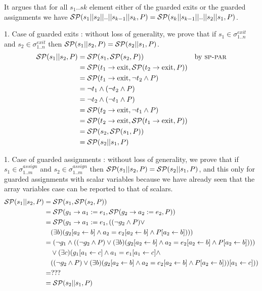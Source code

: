 \documentclass[a4paper,10pt]{article}
\newcommand{\KWexit}{\ensuremath{\mathrm{exit}}}
\newcommand{\vstate}[2]{\ensuremath{\sigma^{\mathit{#1}}_{\mathit{#2}}\xspace}}
\newcommand{\sppar}{\textsc{sp-par}\xspace}
\newenvironment{proof}[1][Proof.]{\begin{trivlist}
\item[\hskip \labelsep {\bfseries #1}]}{\end{trivlist}}
\begin{document}
\begin{proof}
  It argues that for all $s_1 .. sk$ element either of the guarded exits or the guarded assignments
  we have $\mathcal{SP}(s_1||s_2|| .. ||s_{k-1}||s_k,P)=\mathcal{SP}(s_k||s_{k-1}|| .. ||s_2||s_1,P)$. 

1. Case of guarded exits : without loss of generality, 
   we prove that if $s_1 \in \vstate{exit}{1..n}$ and $s_2 \in \vstate{exit}{1..n}$ then  
   $\mathcal{SP}(s_1||s_2,P)=\mathcal{SP}(s_2||s_1,P)$.
  \begin{align*}
    \spost{s_1||s_2}{P}
    &=\spost{s_1}{\spost{s_2}{P}} && \text{by \sppar}\\
    &=\spost{t_1 \rightarrow \KWexit}{\spost{t_2 \rightarrow \KWexit}{P}}\\
    &=\spost{t_1 \rightarrow \KWexit}{\neg t_2 \land P}\\
    &=\neg t_1 \land (\neg t_2 \land P)\\
    &=\neg t_2 \land (\neg t_1 \land P)\\
    &=\spost{t_2 \rightarrow \KWexit}{\neg t_1 \land P}\\
    &=\spost{t_2 \rightarrow \KWexit}{\spost{t_1 \rightarrow \KWexit}{P}}\\
    &=\spost{s_2}{\spost{s_1}{P}}\\
    &=\spost{s_2||s_1}{P}
  \end{align*}

1. Case of guarded assignments : without loss of generality, 
   we prove that if $s_1 \in \vstate{assign}{1..m}$ and $s_2 \in \vstate{assign}{1..m}$ then  
   $\mathcal{SP}(s_1||s_2,P)=\mathcal{SP}(s_2||s_1,P)$, and this only for guarded assignments with 
   scalar variables because we have already seen that the array variables case can be reported 
   to that of scalars.
  \begin{align*}
    \mathcal{SP}(s_1||s_2,P)
    &=\mathcal{SP}(s_1,\mathcal{SP}(s_2,P)) \\
    &=\mathcal{SP}(g_1 \rightarrow a_1 := e_1,\mathcal{SP}(g_2 \rightarrow a_2 := e_2,P)) \\
    &=\mathcal{SP}(g_1 \rightarrow a_1 := e_1,((\neg g_2 \land P) \lor\\
    &\quad (\exists b) (g_2[a_2 \leftarrow b] \land a_2 =e_2[a_2 \leftarrow b] \land P[a_2 \leftarrow b])))\\
    &=( \neg g_1 \land ((\neg g_2 \land P) \lor
    (\exists b) (g_2[a_2 \leftarrow b] \land a_2 =e_2[a_2 \leftarrow b] \land P[a_2 \leftarrow b]))) \\
    &\quad \lor (\exists c)(g_1[a_1 \leftarrow c]\land a_1 =e_1[a_1 \leftarrow c] \land \\
    &\quad ((\neg g_2 \land P) \lor (\exists b) (g_2[a_2 \leftarrow b] \land a_2 =e_2[a_2 \leftarrow b] \land P[a_2 \leftarrow b]))[a_1 \leftarrow c]))\\
    &= ???\\
    &=\mathcal{SP}(s_2||s_1,P)
  \end{align*}

\end{proof}
\end{document}
